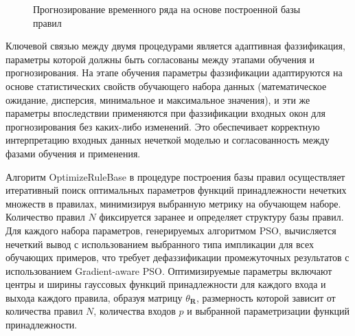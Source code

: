 \begin{figure}[h]
	\label{alg:fuzzy-ts-forecasting}
	\caption{Прогнозирование временного ряда на основе построенной базы правил}
\end{figure}

Ключевой связью между двумя процедурами является адаптивная фаззификация, параметры которой должны быть согласованы между этапами обучения и прогнозирования. На этапе обучения параметры фаззификации адаптируются на основе статистических свойств обучающего набора данных (математическое ожидание, дисперсия, минимальное и максимальное значения), и эти же параметры впоследствии применяются при фаззификации входных окон для прогнозирования без каких-либо изменений. Это обеспечивает корректную интерпретацию входных данных нечеткой моделью и согласованность между фазами обучения и применения.

Алгоритм OptimizeRuleBase в процедуре построения базы правил осуществляет итеративный поиск оптимальных параметров функций принадлежности нечетких множеств в правилах, минимизируя выбранную метрику на обучающем наборе. Количество правил $N$ фиксируется заранее и определяет структуру базы правил. Для каждого набора параметров, генерируемых алгоритмом PSO, вычисляется нечеткий вывод с использованием выбранного типа импликации для всех обучающих примеров, что требует дефаззификации промежуточных результатов с использованием Gradient-aware PSO. Оптимизируемые параметры включают центры и ширины гауссовых функций принадлежности для каждого входа и выхода каждого правила, образуя матрицу $\theta_{\mathbf{R}}$, размерность которой зависит от количества правил $N$, количества входов $p$ и выбранной параметризации функций принадлежности.


